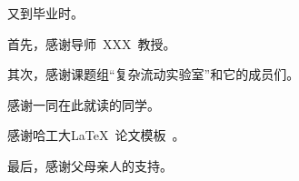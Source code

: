 \begin{acknowledgements}

又到毕业时。%

首先，感谢导师~XXX~教授。

其次，感谢课题组“复杂流动实验室”和它的成员们。%

感谢一同在此就读的同学。

感谢哈工大\LaTeX\ 论文模板\hithesis\ 。%

最后，感谢父母亲人的支持。%



\end{acknowledgements}
